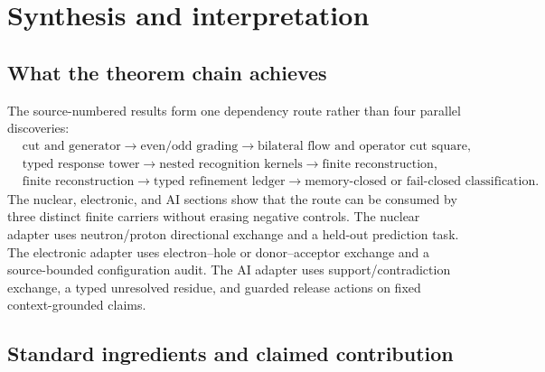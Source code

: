 \section{Synthesis and interpretation}

\subsection{What the theorem chain achieves}

The source-numbered results form one dependency route rather than four parallel discoveries:
\[
\begin{aligned}
&\text{cut and generator}
 \to \text{even/odd grading}
 \to \text{bilateral flow and operator cut square},\\
&\text{typed response tower}
 \to \text{nested recognition kernels}
 \to \text{finite reconstruction},\\
&\text{finite reconstruction}
 \to \text{typed refinement ledger}
 \to \text{memory-closed or fail-closed classification}.
\end{aligned}
\]
The nuclear, electronic, and AI sections show that the route can be consumed by three distinct finite carriers without erasing negative controls. The nuclear adapter uses neutron/proton directional exchange and a held-out prediction task. The electronic adapter uses electron--hole or donor--acceptor exchange and a source-bounded configuration audit. The AI adapter uses support/contradiction exchange, a typed unresolved residue, and guarded release actions on fixed context-grounded claims.

\subsection{Standard ingredients and claimed contribution}

